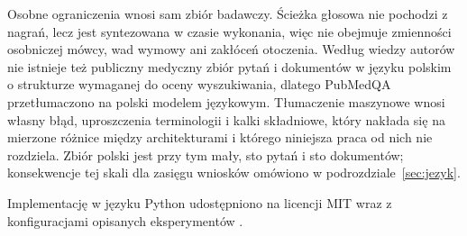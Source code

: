 Osobne ograniczenia wnosi sam zbiór badawczy. Ścieżka głosowa nie pochodzi z nagrań, lecz jest
syntezowana w czasie wykonania, więc nie obejmuje zmienności osobniczej mówcy, wad wymowy ani
zakłóceń otoczenia. Według wiedzy autorów nie istnieje też publiczny medyczny zbiór pytań i dokumentów w języku polskim
o strukturze wymaganej do oceny wyszukiwania, dlatego PubMedQA przetłumaczono na polski modelem
językowym. Tłumaczenie maszynowe wnosi własny błąd, uproszczenia terminologii i kalki składniowe,
który nakłada się na mierzone różnice między architekturami i którego niniejsza praca od nich nie
rozdziela. Zbiór polski jest przy tym mały, sto pytań i sto dokumentów; konsekwencje tej skali
dla zasięgu wniosków omówiono w podrozdziale~\ref{sec:jezyk}.

Implementację w języku Python udostępniono na licencji MIT wraz z konfiguracjami opisanych
eksperymentów \cite{reteva}.
